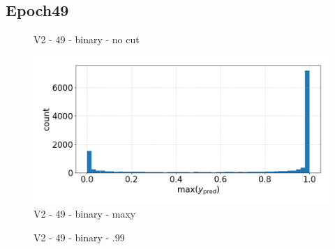 \subsection{Epoch49}
\begin{figure}[h]
    \centering
    \qquad
    \caption{V2 - 49 - binary - no cut\label{fig:synth_spectra}}
\end{figure}
\begin{figure}
    \centering
    \includegraphics[width=.6\linewidth]{figures/v2/vit_model_V2max_ypred_binary_49.png}
    \caption{V2 - 49 - binary - maxy}
    \label{fig:49Binary}
\end{figure}
\begin{figure}[h]
    \centering
    \qquad
    \caption{V2 - 49 - binary - .99\label{fig:synth_spectra}}
\end{figure}
